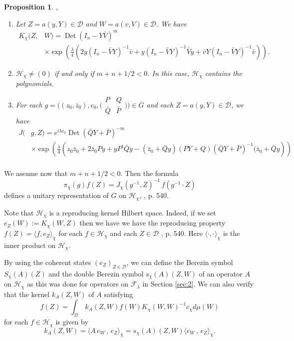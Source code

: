 \documentclass[12pt]{amsart}
\numberwithin{equation}{section}
\newtheorem{proposition}[theorem]{Proposition}
\DeclareMathOperator{\Det}{Det} \DeclareMathOperator{\Tr}{Tr}
\begin{document}
\begin{proposition} \label{prop:Jac} {\rm \cite{Ne}, \cite{CaPad2}} \begin{enumerate} \item Let $Z=a(y,Y)\in {\mathcal D}$ and $W=a(v,V)\in {\mathcal D}$. 
We have \begin{align*}K_{\chi}(Z,&W)=\Det (I_n-Y{\bar V})^{m}\\
&\times \exp \left( \tfrac{\lambda}{4}\left(2y(I_n-{\bar V}Y)^{-1}{\bar v}+y(I_n-{\bar V}Y)^{-1}{\bar V}y+{\bar v}Y(I_n-{\bar V}Y)^{-1}{\bar v}\right)\right). \end{align*}

\item ${\mathcal
H}_{\chi}\not= (0)$ if and only if $m+n+1/2<0$. In this case, ${\mathcal
H}_{\chi}$ contains the polynomials.

\item For each $g=\bigl((z_0,{\bar z_0}),c_0,\bigl(\begin{smallmatrix} P&Q\\
{\bar Q}&{\bar P}\end{smallmatrix}\bigr)\bigr)\in G$ and each $Z=a(y,Y)\in {\mathcal D}$, we have
\begin{align*}J(&g, Z)=e^{i\lambda c_0}\Det ({\bar Q}Y+{\bar P})^{-m}\\
&\times \exp \left(\tfrac{\lambda}{4}\left(z_0{\bar z_0}+2{\bar z_0}Py+yP^t{\bar Q}y-({\bar z_0}+{\bar Q}y)(PY+Q)({\bar Q}Y+{\bar P})^{-1}({\bar z_0}+{\bar Q}y\right)
\right)\\ \end{align*}
\end{enumerate} \end{proposition}

We assume now that $m+n+1/2<0$. Then the formula
\begin{equation*}\pi_{\chi}(g)f(Z)=J_{\chi}(g^{-1},Z)^{-1}\,f(g^{-1}\cdot
Z) \end{equation*}  defines a unitary representation of $G$ on
${\mathcal H}_{\chi}$, \cite{Ne}, p. 540.

Note that ${\mathcal H}_{\chi}$ is a reproducing kernel
Hilbert space. Indeed, if we set $e_Z(W):=K_{\chi}(W,Z)$ then we have we
have the reproducing property $f(Z)=\langle f,e_Z\rangle_{\chi}$ for
each $f\in {\mathcal H}_{\chi}$ and each $Z\in {\mathcal D}$
\cite{Ne}, p. 540. Here $\langle\cdot,\cdot\rangle_{\chi}$ is
the inner product on ${\mathcal H}_{\chi}$.

By using the coherent states $(e_Z)_{Z\in {\mathcal D}}$, we can define the Berezin symbol
$S_{\chi}(A)(Z)$ and the double Berezin symbol $s_{\chi}(A)(Z,W)$ of an operator $A$
on ${\mathcal H}_{\chi}$ as this was done for operators on ${\mathcal F}_{\lambda}$
in Section \ref{sec:2}. We can also verify that the kernel $k_A(Z,W)$ of $A$ satisfying
\begin{equation*}f(Z) =\int_{\mathcal D}\,k_A(Z,W)f(W)
K_{\chi}(W,W)^{-1}c_{\chi}d\mu (W)\end{equation*}
for each $f\in {\mathcal H}_{\chi}$ is given by
\begin{equation*}k_A(Z,W)=\langle A\,e_W\,,\,e_Z\rangle_{\chi}=s_{\chi}(A)(Z,W)
\langle e_W\,,\,e_Z\rangle_{\chi}. \end{equation*}
\end{document}
